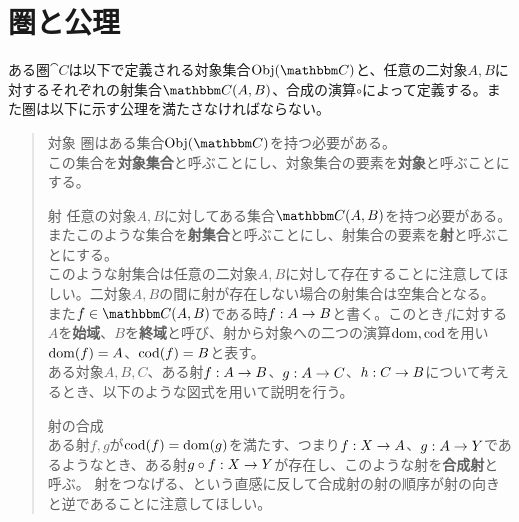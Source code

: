 \section{圏と公理}\label{chap-2-category-and-axiom}
	\begin{define}\label{def-category}
    ある圏$\cat{C}$は以下で定義される対象集合$\obj{C}$と、任意の二対象$A,B$に対するそれぞれの射集合$\arset{C}{A}{B}$、合成の演算$\circ$によって定義する。また圏は以下に示す公理を満たさなければならない。
		\begin{quote}
			\begin{mydescription}
			\item[対象] 圏はある集合$\obj{C}$を持つ必要がある。\\
			この集合を\textbf{対象集合}と呼ぶことにし、対象集合の要素を\textbf{対象}と呼ぶことにする。
			\item[射] 任意の対象$A,B$に対してある集合$\arset{C}{A}{B}$を持つ必要がある。
      またこのような集合を\textbf{射集合}と呼ぶことにし、射集合の要素を\textbf{射}と呼ぶことにする。\\
			このような射集合は任意の二対象$A,B$に対して存在することに注意してほしい。二対象$A,B$の間に射が存在しない場合の射集合は空集合となる。
			\\また$f\in\arset{C}{A}{B}$である時$f:A\rightarrow B$と書く。このとき$f$に対する$A$を\textbf{始域}、$B$を\textbf{終域}と呼び、射から対象への二つの演算$\mathrm{dom},\mathrm{cod}$を用い$\mathrm{dom}(f)=A$、$\mathrm{cod}(f)=B$と表す。\\

			ある対象$A,B,C$、ある射$f:A\rightarrow B$、$g:A\rightarrow C$、$h:C\rightarrow B$について考えるとき、以下のような図式を用いて説明を行う。
			\begin{center}
			\end{center}
			\item[射の合成]~\\ ある射$f,g$が$\mathrm{cod}(f)=\mathrm{dom}(g)$を満たす、つまり$f:X\rightarrow A$、$g:A\rightarrow Y$であるようなとき、ある射$g\circ f:X\rightarrow Y$が存在し、このような射を\textbf{合成射}と呼ぶ。
			射をつなげる、という直感に反して合成射の射の順序が射の向きと逆であることに注意してほしい。


\end{mydescription}
\end{quote}
\end{define}
